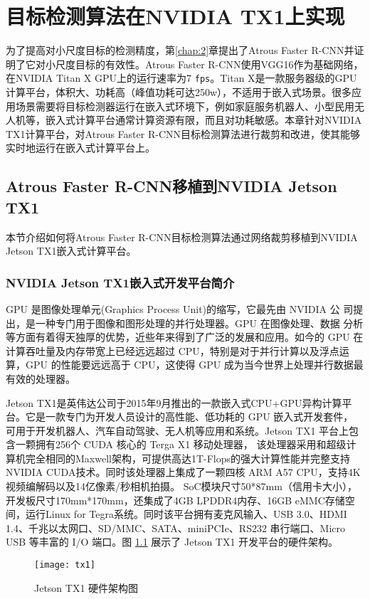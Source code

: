 \chapter{目标检测算法在NVIDIA TX1上实现}
为了提高对小尺度目标的检测精度，第\ref{chap:2}章提出了Atrous Faster R-CNN并证明了它对小尺度目标的有效性。Atrous Faster R-CNN使用VGG16作为基础网络，在NVIDIA Titan X GPU上的运行速率为7 \texttt{fps}。Titan X是一款服务器级的GPU计算平台，体积大、功耗高（峰值功耗可达250w），不适用于嵌入式场景。很多应用场景需要将目标检测器运行在嵌入式环境下，例如家庭服务机器人、小型民用无人机等，嵌入式计算平台通常计算资源有限，而且对功耗敏感。本章针对NVIDIA TX1计算平台，对Atrous Faster R-CNN目标检测算法进行裁剪和改进，使其能够实时地运行在嵌入式计算平台上。

\section{Atrous Faster R-CNN移植到NVIDIA Jetson TX1}
本节介绍如何将Atrous Faster R-CNN目标检测算法通过网络裁剪移植到NVIDIA Jetson TX1嵌入式计算平台。
\subsection{NVIDIA Jetson TX1嵌入式开发平台简介}
GPU 是图像处理单元(Graphics Process Unit)的缩写，它最先由 NVIDIA 公 司提出，是一种专门用于图像和图形处理的并行处理器。GPU 在图像处理、数据 分析等方面有着得天独厚的优势，近些年来得到了广泛的发展和应用。如今的 GPU 在计算吞吐量及内存带宽上已经远远超过 CPU，特别是对于并行计算以及浮点运 算，GPU 的性能要远远高于 CPU，这使得 GPU 成为当今世界上处理并行数据最有效的处理器。

Jetson TX1是英伟达公司于2015年9月推出的一款嵌入式CPU+GPU异构计算平台。它是一款专门为开发人员设计的高性能、低功耗的 GPU 嵌入式开发套件， 可用于开发机器人、汽车自动驾驶、无人机等应用和系统。Jetson TX1 平台上包含一颗拥有256个 CUDA 核心的 Terga X1 移动处理器， 该处理器采用和超级计算机完全相同的Maxwell架构，可提供高达1T-Flops的强大计算性能并完整支持NVIDIA CUDA技术。同时该处理器上集成了一颗四核 ARM A57 CPU，支持4K视频编解码以及14亿像素/秒相机拍摄。
SoC模块尺寸50*87mm（信用卡大小），开发板尺寸170mm*170mm，还集成了4GB LPDDR4内存、16GB eMMC存储空间，运行Linux for Tegra系统。同时该平台拥有麦克风输入、USB 3.0、HDMI 1.4、千兆以太网口、SD/MMC、SATA、miniPCIe、RS232 串行端口、Micro
USB 等丰富的 I/O 端口。图 \ref{fig:tx1} 展示了 Jetson TX1 开发平台的硬件架构。
\begin{figure}[h]
	\centering
	\texttt{[image: tx1]}
	\caption{Jetson TX1 硬件架构图}
	\label{fig:tx1}
\end{figure}

